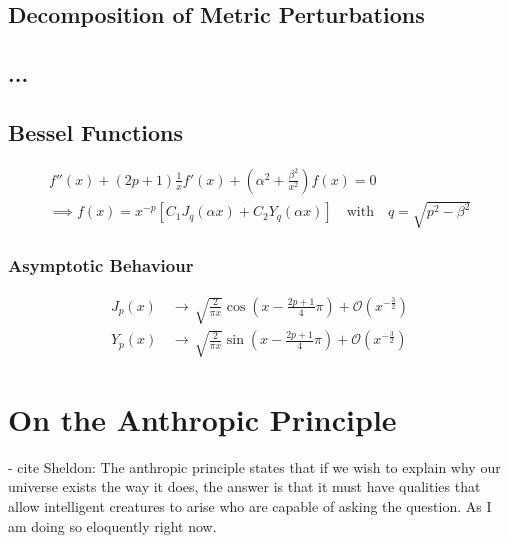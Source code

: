 \documentclass[12pt,parskip=half]{scrreprt}
\begin{document}
\begin{appendices}
\section{Decomposition of Metric Perturbations}\label{app:deriv_decompose}

\section{...}

\section{Bessel Functions}\label{app:bessel}

\begin{align}
	f''(x) + \left(2p+1\right)\frac{1}{x} f'(x) + \left(\alpha^2 + \frac{\beta^2}{x^2}\right) f(x) = 0 \\
	\implies f(x) = x^{-p} \left[C_1 J_q(\alpha x) + C_2 Y_q(\alpha x)\right] \quad \text{with} \quad q = \sqrt{p^2 - \beta^2}
\end{align}

\subsection*{Asymptotic Behaviour}
\begin{align}
	J_p(x) \, &\rightarrow \, \sqrt{\frac{2}{\pi x}} \cos(x-\frac{2p+1}{4}\pi) + \mathcal{O}(x^{-\frac{3}{2}}) \\
	Y_p(x) \, &\rightarrow \, \sqrt{\frac{2}{\pi x}} \sin(x-\frac{2p+1}{4}\pi) + \mathcal{O}(x^{-\frac{3}{2}})
\end{align}


\chapter{On the Anthropic Principle}\label{app:anthropic}

- cite Sheldon: The anthropic principle states that if we wish to explain why our universe exists the way it does, the answer is that it must have qualities that allow intelligent creatures to arise who are capable of asking the question. As I am doing so eloquently right now.

\end{appendices}





\end{document}
